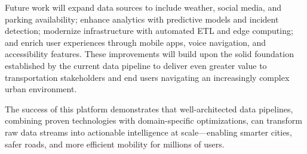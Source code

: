 Future work will expand data sources to include weather, social media, and parking availability; enhance analytics with predictive models and incident detection; modernize infrastructure with automated ETL and edge computing; and enrich user experiences through mobile apps, voice navigation, and accessibility features. These improvements will build upon the solid foundation established by the current data pipeline to deliver even greater value to transportation stakeholders and end users navigating an increasingly complex urban environment.

The success of this platform demonstrates that well-architected data pipelines, combining proven technologies with domain-specific optimizations, can transform raw data streams into actionable intelligence at scale—enabling smarter cities, safer roads, and more efficient mobility for millions of users.
